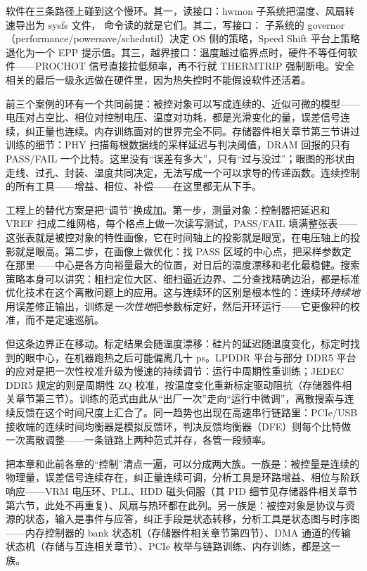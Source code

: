 软件在三条路径上碰到这个慢环。其一，读接口：hwmon 子系统把温度、风扇转速导出为 sysfs 文件， 命令读的就是它们。其二，写接口： 子系统的 governor（performance/powersave/schedutil）决定 OS 侧的策略，Speed Shift 平台上策略退化为一个 EPP 提示值。其三，越界接口：温度越过临界点时，硬件不等任何软件——PROCHOT 信号直接拉低频率，再不行就 THERMTRIP 强制断电。安全相关的最后一级永远做在硬件里，因为热失控时不能假设软件还活着。


前三个案例的环有一个共同前提：被控对象可以写成连续的、近似可微的模型——电压对占空比、相位对控制电压、温度对功耗，都是光滑变化的量，误差信号连续，纠正量也连续。内存训练面对的世界完全不同。存储器件相关章节第三节讲过训练的细节：PHY 扫描每根数据线的采样延迟与判决阈值，DRAM 回报的只有 PASS/FAIL 一个比特。这里没有“误差有多大”，只有“过与没过”；眼图的形状由走线、过孔、封装、温度共同决定，无法写成一个可以求导的传递函数。连续控制的所有工具——增益、相位、补偿——在这里都无从下手。

工程上的替代方案是把“调节”换成加。第一步，测量对象：控制器把延迟和 VREF 扫成二维网格，每个格点上做一次读写测试，PASS/FAIL 填满整张表——这张表就是被控对象的特性画像，它在时间轴上的投影就是眼宽，在电压轴上的投影就是眼高。第二步，在画像上做优化：找 PASS 区域的中心点，把采样参数定在那里——中心是各方向裕量最大的位置，对日后的温度漂移和老化最稳健。搜索策略本身可以讲究：粗扫定位大区、细扫逼近边界、二分查找精确边沿，都是标准优化技术在这个离散问题上的应用。这与连续环的区别是根本性的：连续环\emph{持续地}用误差修正输出，训练是\emph{一次性地}把参数标定好，然后开环运行——它更像秤的校准，而不是定速巡航。

但这条边界正在移动。标定结果会随温度漂移：硅片的延迟随温度变化，标定时找到的眼中心，在机器跑热之后可能偏离几十 ps。LPDDR 平台与部分 DDR5 平台的应对是把一次性校准升级为慢速的持续调节：运行中周期性重训练；JEDEC DDR5 规定的则是周期性 ZQ 校准，按温度变化重新标定驱动阻抗（存储器件相关章节第三节）。训练的范式由此从“出厂一次”走向“运行中微调”，离散搜索与连续反馈在这个时间尺度上汇合了。同一趋势也出现在高速串行链路里：PCIe/USB 接收端的连续时间均衡器是模拟反馈环，判决反馈均衡器（DFE）则每个比特做一次离散调整——一条链路上两种范式并存，各管一段频率。


把本章和此前各章的“控制”清点一遍，可以分成两大族。一族是：被控量是连续的物理量，误差信号连续存在，纠正量连续可调，分析工具是环路增益、相位与阶跃响应——VRM 电压环、PLL、HDD 磁头伺服（其 PID 细节见存储器件相关章节第六节，此处不再重复）、风扇与热环都在此列。另一族是：被控对象是协议与资源的状态，输入是事件与应答，纠正手段是状态转移，分析工具是状态图与时序图——内存控制器的 bank 状态机（存储器件相关章节第四节）、DMA 通道的传输状态机（存储与互连相关章节）、PCIe 枚举与链路训练、内存训练，都是这一族。

